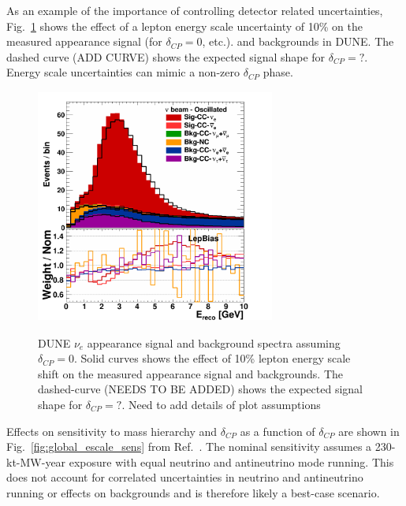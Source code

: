 As an example of the importance of controlling detector related uncertainties,
Fig.~\ref{fig:spectraleffect} shows the effect of a lepton energy scale 
uncertainty of 10\% on the measured 
appearance signal (for $\delta_{CP}=0$, etc.). 
and backgrounds in DUNE. The dashed curve (ADD CURVE) shows the expected signal shape
 for $\delta_{CP}=?$. Energy scale uncertainties can mimic a non-zero
$\delta_{CP}$ phase. 
\begin{figure}[h!]
\centering
\includegraphics[width=0.7\textwidth,height=7.7cm]{figures/lepbias10}
\label{fig:spectraleffect}
  \caption{DUNE $\nu_e$ appearance signal and background spectra assuming 
$\delta_{CP}=0$. 
Solid curves shows the effect of 10\% lepton energy scale shift on the 
measured appearance signal 
and backgrounds. The dashed-curve (NEEDS TO BE ADDED) shows the 
expected signal shape for 
$\delta_{CP}=?$.
{\color{red} 
Need to add details of plot assumptions
}
}
\end{figure}
Effects on sensitivity to mass hierarchy and $\delta_{CP}$ as a function of 
$\delta_{CP}$ are shown in Fig.~\ref{fig:global_escale_sens} from Ref.~\cite{DUNECDR}. 
The nominal sensitivity assumes a 230-kt-MW-year 
exposure with equal neutrino and antineutrino mode running. 
This does not account for correlated uncertainties in neutrino and 
antineutrino running or effects on backgrounds and is therefore likely
a best-case scenario. 
